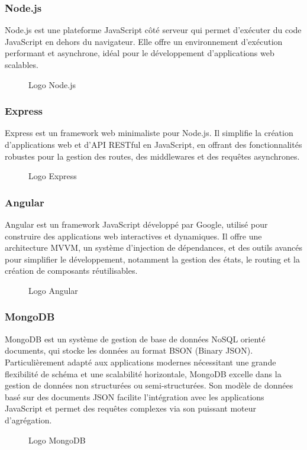 \subsubsection*{Node.js}
Node.js est une plateforme JavaScript côté serveur qui permet d'exécuter du code JavaScript en dehors du navigateur. Elle offre un environnement d'exécution performant et asynchrone, idéal pour le développement d'applications web scalables.\cite{b6}
\begin{figure}[H]
\centering
{}
\caption{Logo Node.js}
\end{figure}

\subsubsection*{Express}
Express est un framework web minimaliste pour Node.js. Il simplifie la création d'applications web et d'API RESTful en JavaScript, en offrant des fonctionnalités robustes pour la gestion des routes, des middlewares et des requêtes asynchrones.
\begin{figure}[H]
\centering
{}
\caption{Logo Express}
\end{figure}

\subsubsection*{Angular}
Angular est un framework JavaScript développé par Google, utilisé pour construire des applications web interactives et dynamiques. Il offre une architecture MVVM, un système d'injection de dépendances, et des outils avancés pour simplifier le développement, notamment la gestion des états, le routing et la création de composants réutilisables.\cite{b10}
\begin{figure}[H]
\centering
{}
\caption{Logo Angular}
\end{figure}

\subsubsection*{MongoDB}
MongoDB est un système de gestion de base de données NoSQL orienté documents, qui stocke les données au format BSON (Binary JSON). Particulièrement adapté aux applications modernes nécessitant une grande flexibilité de schéma et une scalabilité horizontale, MongoDB excelle dans la gestion de données non structurées ou semi-structurées. Son modèle de données basé sur des documents JSON facilite l'intégration avec les applications JavaScript et permet des requêtes complexes via son puissant moteur d'agrégation.\cite{b9}
\begin{figure}[H]
\centering
{}
\caption{Logo MongoDB}
\end{figure}

